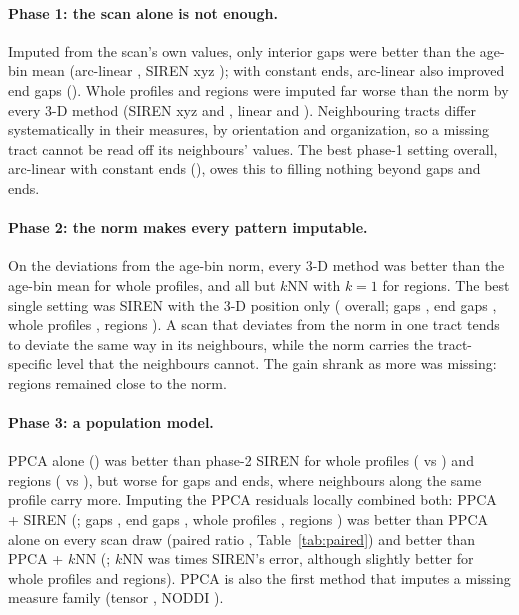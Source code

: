 \documentclass[11pt]{article}
\begin{document}
\paragraph{Phase 1: the scan alone is not enough.} Imputed from the scan's own values, only interior gaps were better
than the age-bin mean (arc-linear \rPoneArcGap{}, SIREN xyz \rPoneSirenGap{}); with constant ends, arc-linear also
improved end gaps (\rPoneArcEnd{}). Whole profiles and regions were imputed far worse than the norm by every 3-D
method (SIREN xyz \rPoneSirenWhole{} and \rPoneSirenRegion{}, linear \rPoneLinearWhole{} and \rPoneLinearRegion{}).
Neighbouring tracts differ systematically in their measures, by orientation and organization, so a missing tract
cannot be read off its neighbours' values. The best phase-1 setting overall, arc-linear with constant ends
(\rPoneArc{}), owes this to filling nothing beyond gaps and ends.

\paragraph{Phase 2: the norm makes every pattern imputable.} On the deviations from the age-bin norm, every 3-D method
was better than the age-bin mean for whole profiles, and all but $k$NN with $k=1$ for regions. The best single setting was SIREN
with the 3-D position only (\rPtwoSiren{} overall; gaps \rPtwoSirenGap{}, end gaps \rPtwoSirenEnd{}, whole profiles
\rPtwoSirenWhole{}, regions \rPtwoSirenRegion{}). A scan that deviates from the norm in one tract tends to deviate
the same way in its neighbours, while the norm carries the tract-specific level that the neighbours cannot. The gain
shrank as more was missing: regions remained close to the norm.

\paragraph{Phase 3: a population model.} PPCA alone (\rPpca{}) was better than phase-2 SIREN for whole profiles
(\rPpcaWhole{} vs \rPtwoSirenWhole) and regions (\rPpcaRegion{} vs \rPtwoSirenRegion), but worse for gaps and ends,
where neighbours along the same profile carry more. Imputing the PPCA residuals locally combined both: PPCA + SIREN
(\rDefault{}; gaps \rDefaultGap{}, end gaps \rDefaultEnd{}, whole profiles \rDefaultWhole{}, regions
\rDefaultRegion{}) was better than PPCA alone on every scan draw (paired ratio \cARatio{}, Table~\ref{tab:paired}) and
better than PPCA + $k$NN (\rPpcaKnn{}; $k$NN was \cBRatio{} times SIREN's error, although slightly better for whole
profiles and regions). PPCA is also the first method that imputes a missing measure family (tensor \rPpcaWdti{},
NODDI \rPpcaWnoddi{}).
\end{document}
